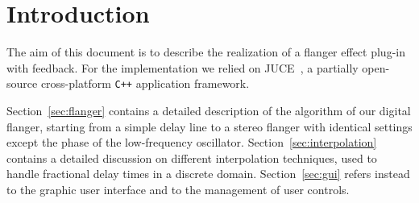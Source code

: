 \section{Introduction}

The aim of this document is to describe the realization of a flanger effect plug-in with feedback. For the implementation we relied on JUCE~\cite{juce}, a partially open-source cross-platform \texttt{C++} application framework.

Section~\ref{sec:flanger} contains a detailed description of the algorithm of our digital flanger, starting from a simple delay line to a stereo flanger with identical settings except the phase of the low-frequency oscillator.
Section~\ref{sec:interpolation} contains a detailed discussion on different interpolation techniques, used to handle fractional delay times in a discrete domain.
Section~\ref{sec:gui} refers instead to the graphic user interface and to the management of user controls.